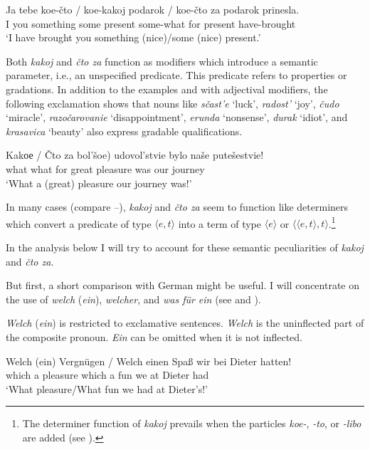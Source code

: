 \documentclass[output=paper,colorlinks,citecolor=brown]{langscibook}
\begin{document}
\ea \label{ex:zi08:15}
    \gll Ja tebe koe-čto / {} koe-kakoj podarok / \minsp{*} koe-čto za podarok prinesla.\\
    I you something {} {} some present {} {} some-what for present have-brought\\
    \glt `I have brought you something (nice)/some (nice) present.'
\z

\noindent Both \textit{kakoj} and \textit{čto za} function as modifiers which introduce a semantic parameter, i.e., an unspecified predicate. This predicate refers to properties or gradations. In addition to the examples  and  with adjectival modifiers, the following exclamation shows that nouns like \textit{sčast'e} `luck', \textit{radost'} `joy', \textit{čudo} `miracle', \textit{razočarovanie} `disappointment', \textit{erunda} `nonsense', \textit{durak} `idiot', and \textit{krasavica} `beauty' also express gradable qualifications.

\ea \label{ex:zi08:16}
    \gll Kakое / {} Čto za \minsp{(} bol'šoe) udovol'stvie bylo naše putešestvie!\\
    what {} {} what for {} great pleasure was our journey\\
    \glt `What a (great) pleasure our journey was!'
\z

\noindent In many cases (compare --), \textit{kakoj} and \textit{čto za} seem to function like determiners which convert a predicate of type $\langle e,t \rangle$ into a term of type $\langle e \rangle$ or $\langle \langle e,t \rangle ,t \rangle $.\footnote{\label{fn:zi08:4}The determiner function of \textit{kakoj} prevails when the particles \textit{koe-}, \textit{-to}, or \textit{-libo} are added (see \citealt{Kagan2007}).}

In the analysis below I will try to account for these semantic peculiarities of \textit{kakoj} and \textit{čto za}.

But first, a short comparison with German might be useful. I will concentrate on the use of \textit{welch} (\textit{ein}), \textit{welcher}, and \textit{was für ein} (see \citealt{Engel1988} and \citealt{Bhatt1990}). 

\textit{Welch} (\textit{ein}) is restricted to exclamative sentences. \textit{Welch} is the uninflected part of the composite pronoun. \textit{Ein} can be omitted when it is not inflected.

\ea \label{ex:zi08:17}
    \gll Welch (ein) Vergnügen / Welch einen Spaß wir bei Dieter hatten!\\
    which a pleasure {} which a fun we at Dieter had\\
    \glt `What pleasure/What fun we had at Dieter's!'
\z
\end{document}
